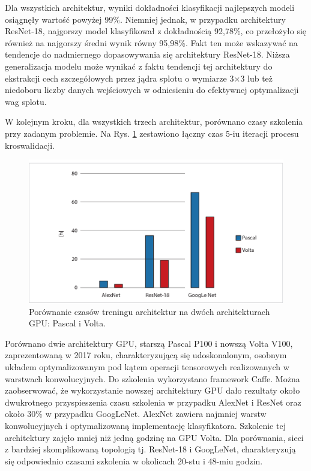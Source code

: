 Dla wszystkich architektur, wyniki dokładności klasyfikacji najlepszych modeli osiągnęły wartość powyżej 99\%. Niemniej jednak, w przypadku architektury ResNet-18, najgorszy model klasyfikował z dokładnością 92,78\%, co przełożyło się również na najgorszy średni wynik równy 95,98\%. Fakt ten może wskazywać na tendencje \linebreak do nadmiernego dopasowywania się architektury ResNet-18. Niższa generalizacja modelu może wynikać z faktu tendencji tej architektury do ekstrakcji cech szczegółowych przez jądra splotu o wymiarze 3$\times$3 lub też niedoboru liczby danych wejściowych w odniesieniu do efektywnej optymalizacji wag splotu.

W kolejnym kroku, dla wszystkich trzech architektur, porównano czasy szkolenia przy zadanym problemie. Na Rys. \ref{fig:training_times} zestawiono łączny czas 5-iu iteracji procesu kroswalidacji.
\begin{figure}[h!]
	\includegraphics[width=\textwidth]{figures/TrainingtimesChart.jpg}
	\caption{Porównanie czasów treningu architektur na dwóch architekturach GPU: Pascal i Volta.}
	\label{fig:training_times}
\end{figure}
Porównano dwie architektury GPU, starszą Pascal P100 i nowszą Volta V100, zaprezentowaną w 2017 roku, charakteryzującą się udoskonalonym, osobnym układem optymalizowanym pod kątem operacji tensorowych realizowanych \linebreak w warstwach konwolucyjnych. Do szkolenia wykorzystano framework Caffe. Można zaobserwować, że wykorzystanie nowszej architektury GPU dało rezultaty około dwukrotnego przyspieszenia czasu szkolenia w przypadku AlexNet i ResNet oraz około 30\% w przypadku GoogLeNet. AlexNet zawiera najmniej warstw konwolucyjnych i optymalizowaną implementację klasyfikatora. Szkolenie tej architektury zajęło mniej niż jedną godzinę na GPU Volta. Dla porównania, sieci z bardziej skomplikowaną topologią tj. ResNet-18 i GoogLeNet, charakteryzują się odpowiednio czasami szkolenia w okolicach 20-stu i 48-miu godzin. 

